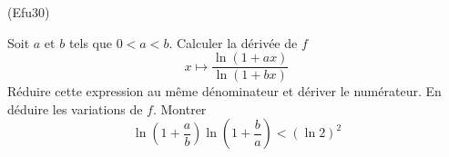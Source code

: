 \begin{tiny}(Efu30)\end{tiny} Soit $a$ et $b$ tels que $0 < a < b$. Calculer la dérivée de $f$
\begin{displaymath}
  x \mapsto \frac{\ln(1+ax)}{\ln(1+bx)}
\end{displaymath}
Réduire cette expression au même dénominateur et dériver le numérateur. En déduire les variations de $f$. Montrer
\begin{displaymath}
  \ln(1+\frac{a}{b}) \ln(1+\frac{b}{a}) < (\ln 2)^2
\end{displaymath}
